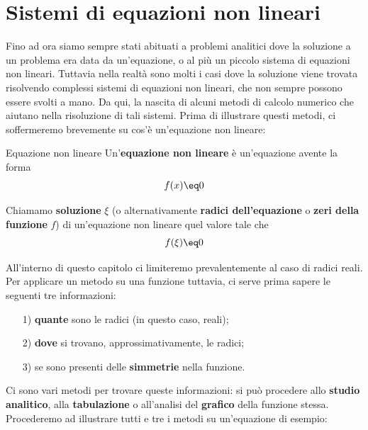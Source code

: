 \chapter{Sistemi di equazioni non lineari}

Fino ad ora siamo sempre stati abituati a problemi analitici dove la soluzione a un problema era data da un'equazione, o al più un piccolo sistema di equazioni non lineari. Tuttavia nella realtà sono molti i casi dove la soluzione viene trovata risolvendo complessi sistemi di equazioni non lineari, che non sempre possono essere svolti a mano. Da qui, la nascita di alcuni metodi di calcolo numerico che aiutano nella risoluzione di tali sistemi. Prima di illustrare questi metodi, ci soffermeremo brevemente su cos'è un'equazione non lineare:

\begin{definition}{Equazione non lineare}
    Un'\textbf{equazione non lineare} è un'equazione avente la forma
    \[ f(x) \eq 0 \]

    Chiamamo \textbf{soluzione} $\xi$ (o alternativamente \textbf{radici dell'equazione} o \textbf{zeri della funzione} $f$) di un'equazione non lineare quel valore tale che
    \[ f(\xi) \eq 0 \]
\end{definition}

All'interno di questo capitolo ci limiteremo prevalentemente al caso di radici reali. Per applicare un metodo su una funzione tuttavia, ci serve prima sapere le seguenti tre informazioni:
\begin{itemize}
    \item [1)] \textbf{quante} sono le radici (in questo caso, reali);
    \item [2)] \textbf{dove} si trovano, approssimativamente, le radici;
    \item [3)] se sono presenti delle \textbf{simmetrie} nella funzione.
\end{itemize}

Ci sono vari metodi per trovare queste informazioni: si può procedere allo \textbf{studio analitico}, alla \textbf{tabulazione} o all'analisi del \textbf{grafico} della funzione stessa. Procederemo ad illustrare tutti e tre i metodi su un'equazione di esempio:

